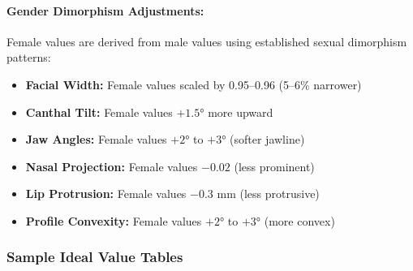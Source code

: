 \begin{table}[h!]
\centering
\caption{Ethnic Adjustment Factors Relative to East Asian Baseline}
\end{table}

\paragraph{Gender Dimorphism Adjustments:}

Female values are derived from male values using established sexual dimorphism patterns:

\begin{itemize}
    \item \textbf{Facial Width:} Female values scaled by 0.95--0.96 (5--6\% narrower)
    \item \textbf{Canthal Tilt:} Female values $+1.5°$ more upward
    \item \textbf{Jaw Angles:} Female values $+2°$ to $+3°$ (softer jawline)
    \item \textbf{Nasal Projection:} Female values $-0.02$ (less prominent)
    \item \textbf{Lip Protrusion:} Female values $-0.3$ mm (less protrusive)
    \item \textbf{Profile Convexity:} Female values $+2°$ to $+3°$ (more convex)
\end{itemize}

\subsubsection{Sample Ideal Value Tables}

